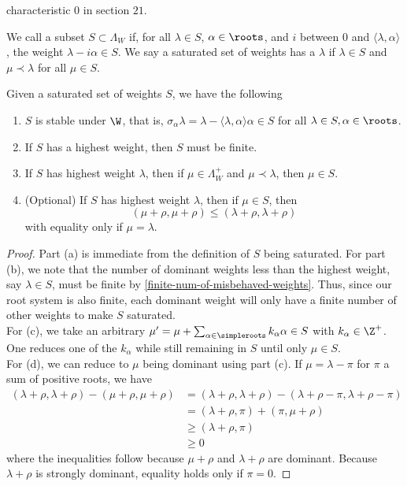 \documentclass[11pt,leqno,oneside]{amsart}
\numberwithin{thm}{section}
\newcommand{\weightlattice}{\Lambda_W}
\newcommand{\halfsum}{\rho}
\begin{document}
characteristic \(0\) in section \(21\).
\begin{defn}
  We call a subset \(S \subset \weightlattice\)  if, for
  all \(\lambda \in S\), \(\alpha \in \roots\), and \(i\) between
  \(0\) and \(\langle \lambda, \alpha \rangle\), the weight
  \(\lambda-i \alpha \in S\). We say a saturated set of weights has a
   \(\lambda\) if \(\lambda \in S\) and \(\mu \prec
  \lambda\) for all \(\mu \in S\).
\end{defn}
\begin{prop}
  Given a saturated set of weights \(S\), we have the following
  \begin{enumerate}
  \item \(S\) is stable under \(\W\), that is, \(\sigma_\alpha \lambda
    = \lambda - \langle \lambda, \alpha \rangle \alpha
    \in S\) for all \(\lambda \in S, \alpha \in \roots\).
  \item If \(S\) has a highest weight, then \(S\) must be finite.
  \item If \(S\) has highest weight \(\lambda\), then if \(\mu \in
    \weightlattice^+\) and \(\mu \prec \lambda\), then \(\mu \in S\).
  \item (Optional) If \(S\) has highest weight \(\lambda\), then if
    \(\mu \in 
    S\), then \[
      (\mu+\halfsum, \mu+\halfsum) \leq (\lambda + \halfsum, \lambda +
      \halfsum)
    \]
    with equality only if \(\mu = \lambda\).
  \end{enumerate}
\end{prop}
\begin{proof}
  Part (a) is immediate from the definition of \(S\) being
  saturated. For part (b), we note that the number of dominant weights
  less than the highest weight, say \(\lambda \in S\), must be
  finite by \ref{finite-num-of-misbehaved-weights}. Thus, since our
  root system is also finite, each dominant weight will only have a
  finite number of other weights to make \(S\) saturated. \\

  For (c), we take an arbitrary \(\mu' = \mu+\sum_{\alpha \in
    \simpleroots} k_\alpha \alpha \in S\) with \(k_\alpha \in
  \Z^+\). One reduces one of the \(k_\alpha\) while still remaining in
  \(S\) until only \(\mu \in S\). \\

  For (d), we can reduce to \(\mu\) being dominant using part (c). If
  \(\mu = \lambda - \pi\) for \(\pi\) a sum of positive roots, we have
  \begin{align*}
    (\lambda+\halfsum, \lambda+\halfsum) - (\mu+\halfsum,
    \mu+\halfsum)
    & = (\lambda + \halfsum, \lambda+\halfsum) -
      (\lambda+\halfsum-\pi, \lambda+\halfsum-\pi) \\
    & = (\lambda+\halfsum, \pi)+(\pi, \mu+\halfsum) \\
    & \geq (\lambda+\halfsum, \pi) \\
    & \geq 0
  \end{align*}
  where the inequalities follow because \(\mu+\halfsum\) and
  \(\lambda+\halfsum\) are dominant. Because \(\lambda+\halfsum\) is
  strongly dominant, equality holds only if \(\pi = 0\).
\end{proof}
\end{document}
